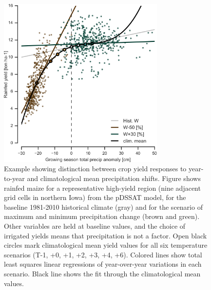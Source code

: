 \documentclass[gmd, manuscript]{copernicus} %
\begin{document}
\begin{figure}[ht]
\centering
   \includegraphics[width=8.3cm]{figures/pryearvclim.png}
   \caption{Example showing distinction between crop yield responses to year-to-year and climatological mean precipitation shifts. 
   Figure shows rainfed maize for a representative high-yield region (nine adjacent grid cells in northern Iowa) from the pDSSAT model, for the baseline 1981-2010 historical climate (gray) and for the scenario of maximum and minimum precipitation change (brown and green). 
   Other variables are held at baseline values, and the choice of irrigated yields means that precipitation is not a factor. 
   Open black circles mark climatological mean yield values for all six temperature scenarios (T-1, +0, +1, +2, +3, +4, +6). 
   Colored lines show total least squares linear regressions of year-over-year variations in each scenario. 
   Black line shows the fit through the climatological mean values.}
   \label{fig:yearvclimpr}
\end{figure}
\end{document}
